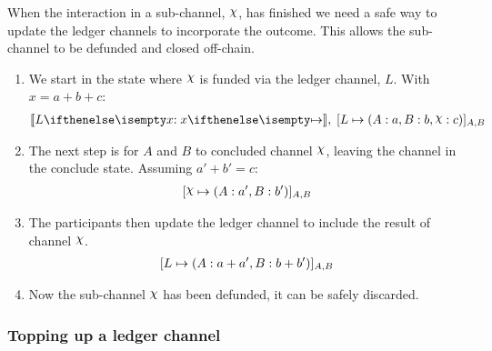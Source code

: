 \documentclass{article}
\begin{document}
When the interaction in a sub-channel, $\rchi$, has finished we need a safe way to update the ledger channels to incorporate the outcome.
This allows the sub-channel to be defunded and closed off-chain.
\begin{enumerate}
  \item We start in the state where $\rchi$ is funded via the ledger channel, $L$. With $x = a + b + c$:
  \begin{align}
    \adj{\holds{L}{x}{}}, \; \finalizable{L}{\alloc{A: a, B: b, \rchi: c}}{A, B}
  \end{align}
  \item The next step is for $A$ and $B$ to concluded channel $\rchi$, leaving the channel in the conclude state. Assuming $a' + b' = c$:
  \begin{align}
    \finalizable{\rchi}{\alloc{A:a', B:b'}}{A,B}
  \end{align}
  \item The participants then update the ledger channel to include the result of channel $\rchi$.
  \begin{align}
    [L \mapsto ( A: a+ a', B: b + b' )]_{A, B}
  \end{align}
  \item Now the sub-channel $\rchi$ has been defunded, it can be safely discarded.
\end{enumerate}

\subsubsection{Topping up a ledger channel}
\end{document}
